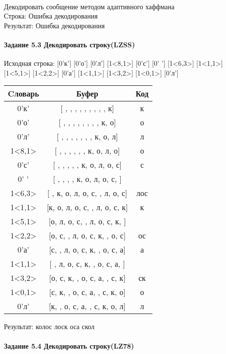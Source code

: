 \documentclass[a4paper, 12pt]{article}
\begin{document}
\\ 

Декодировать сообщение методом адаптивного хаффмана \\
Строка: 
Ошибка декодирования\\
Результат: Ошибка декодирования
\pagebreak
\paragraph{Задание 5.3 Декодировать строку(LZSS)\\}

Исходная строка: [0'к'] [0'о'] [0'л'] [1<8,1>] [0'с'] [0' '] [1<6,3>] [1<1,1>] [1<5,1>] [1<2,2>] [0'а'] [1<1,1>] [1<3,2>] [1<0,1>] [0'л']\\
\begin{table}[h!]
\centering
\begin{tabular}{|c|c|c|}
\hline
 Cловарь & Буфер & Код  \\ \hline
0'к' & [ ,  ,  ,  ,  ,  ,  ,  ,  , к] & к
\\ \hline
0'о' & [ ,  ,  ,  ,  ,  ,  ,  , к, о] & о
\\ \hline
0'л' & [ ,  ,  ,  ,  ,  ,  , к, о, л] & л
\\ \hline
1<8,1> & [ ,  ,  ,  ,  ,  , к, о, л, о] & о
\\ \hline
0'с' & [ ,  ,  ,  ,  , к, о, л, о, с] & с
\\ \hline
0' ' & [ ,  ,  ,  , к, о, л, о, с,  ] &  
\\ \hline
1<6,3> & [ , к, о, л, о, с,  , л, о, с] & лос
\\ \hline
1<1,1> & [к, о, л, о, с,  , л, о, с, к] & к
\\ \hline
1<5,1> & [о, л, о, с,  , л, о, с, к,  ] &  
\\ \hline
1<2,2> & [о, с,  , л, о, с, к,  , о, с] & ос
\\ \hline
0'а' & [с,  , л, о, с, к,  , о, с, а] & а
\\ \hline
1<1,1> & [ , л, о, с, к,  , о, с, а,  ] &  
\\ \hline
1<3,2> & [о, с, к,  , о, с, а,  , с, к] & ск
\\ \hline
1<0,1> & [с, к,  , о, с, а,  , с, к, о] & о
\\ \hline
0'л' & [к,  , о, с, а,  , с, к, о, л] & л
\\ \hline
\end{tabular}
\end{table}

Результат: колос лоск оса скол
\pagebreak
\paragraph{Задание 5.4 Декодировать строку(LZ78)\\}
\end{document}
